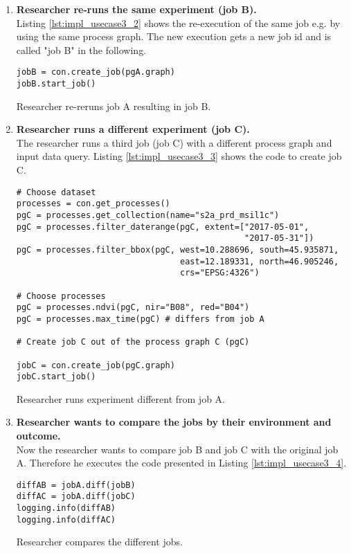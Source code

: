 \documentclass[draft,final]{vutinfth} %
\newenvironment{code}{\captionsetup{type=listing}}{}
\begin{document}
\begin{enumerate}
	\item \textbf{Researcher re-runs the same experiment (job B).}\\
	Listing \ref{lst:impl_usecase3_2} shows the re-execution of the same job e.g. by using the same process graph. The new execution gets a new job id and is called "job B" in the following.
\begin{code}
	\begin{verbatim}
jobB = con.create_job(pgA.graph)
jobB.start_job()
	\end{verbatim}
	\caption{Researcher re-reruns job A resulting in job B.}
	\label{lst:impl_usecase3_2}
\end{code}
	\item \textbf{Researcher runs a different experiment (job C).}\\
	The researcher runs a third job (job C) with a different process graph and input data query. Listing \ref{lst:impl_usecase3_3} shows the code to create job C. 
\begin{code}
	\begin{verbatim}
# Choose dataset
processes = con.get_processes()
pgC = processes.get_collection(name="s2a_prd_msil1c")
pgC = processes.filter_daterange(pgC, extent=["2017-05-01", 
                                              "2017-05-31"])
pgC = processes.filter_bbox(pgC, west=10.288696, south=45.935871, 
                                 east=12.189331, north=46.905246, 
                                 crs="EPSG:4326")
	
# Choose processes
pgC = processes.ndvi(pgC, nir="B08", red="B04")
pgC = processes.max_time(pgC) # differs from job A
	
# Create job C out of the process graph C (pgC)
	
jobC = con.create_job(pgC.graph)
jobC.start_job()
	\end{verbatim}
	\caption{Researcher runs experiment different from job A.}
	\label{lst:impl_usecase3_3}
	
\end{code}

	\item \textbf{Researcher wants to compare the jobs by their environment and outcome.}\\
	Now the researcher wants to compare job B and job C with the original job A. Therefore he executes the code presented in Listing \ref{lst:impl_usecase3_4}.
	
	\begin{code}
		\begin{verbatim}
diffAB = jobA.diff(jobB)
diffAC = jobA.diff(jobC)
logging.info(diffAB)
logging.info(diffAC)
		\end{verbatim}
		\caption{Researcher compares the different jobs.}
		\label{lst:impl_usecase3_4}
		

\end{code}
\end{enumerate}
\end{document}
